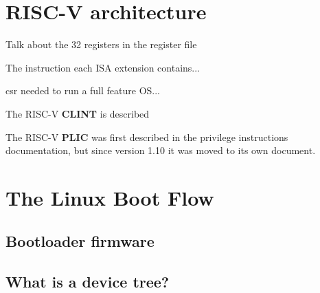 \section{RISC-V architecture}
Talk about the 32 registers in the register file

The instruction each ISA extension contains...

\acrfull{csr} needed to run a full feature OS...

The RISC-V \textbf{CLINT} is described

The RISC-V \textbf{PLIC} was first described in the privilege instructions documentation, but since version 1.10 it was moved to its own document.

\section{The Linux Boot Flow}
\subsection{Bootloader firmware}
\subsection{What is a device tree?}


